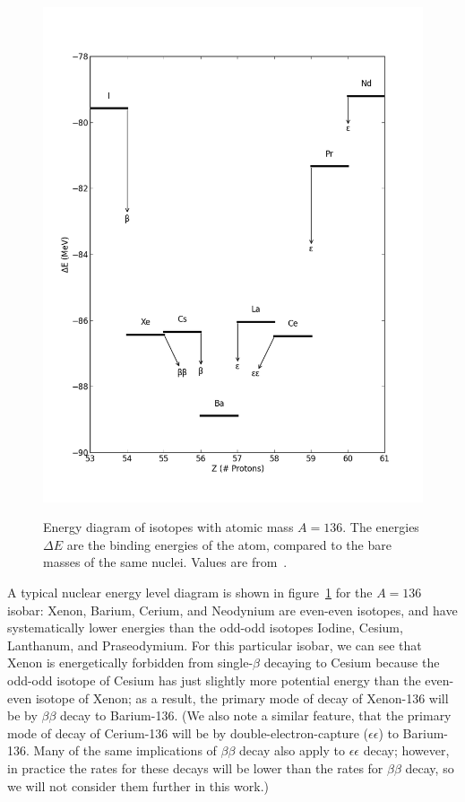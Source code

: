 \begin{figure}
\begin{center}
\includegraphics[keepaspectratio=true,width=\textwidth]{scripts/LevelDiagram.png}
\end{center}
\renewcommand{\baselinestretch}{1}
\small\normalsize
\begin{quote}
\caption{Energy diagram of isotopes with atomic mass $A=136$.  The energies $\Delta E$ are the binding energies of the atom, compared to the bare masses of the same nuclei.  Values are from~\cite{AtomicMassEvaluation}.}
\label{fig:LevelDiagram}
\end{quote}
\end{figure}
\renewcommand{\baselinestretch}{2}
\small\normalsize

A typical nuclear energy level diagram is shown in figure~\ref{fig:LevelDiagram} for the $A=136$ isobar: Xenon, Barium, Cerium, and Neodynium are even-even isotopes, and have systematically lower energies than the odd-odd isotopes Iodine, Cesium, Lanthanum, and Praseodymium.  For this particular isobar, we can see that Xenon is energetically forbidden from single-$\beta$ decaying to Cesium because the odd-odd isotope of Cesium has just slightly more potential energy than the even-even isotope of Xenon; as a result, the primary mode of decay of Xenon-136 will be by $\beta\beta$ decay to Barium-136.  (We also note a similar feature, that the primary mode of decay of Cerium-136 will be by double-electron-capture ($\epsilon\epsilon$) to Barium-136.  Many of the same implications of $\beta\beta$ decay also apply to $\epsilon\epsilon$ decay; however, in practice the rates for these decays will be lower than the rates for $\beta\beta$ decay, so we will not consider them further in this work.)

